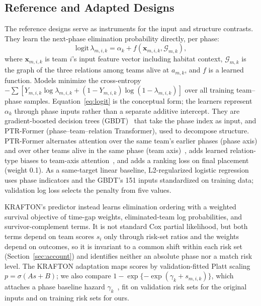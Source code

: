 \documentclass[sigconf,anonymous,nonacm]{acmart}
\begin{document}
\subsection{Reference and Adapted Designs}
\label{sec:method:rq2}
The reference designs serve as instruments for the input and structure contrasts. They learn the next-phase elimination probability directly, per phase:
\begin{equation}
\mathrm{logit}\,\lambda_{m,i,k}=\alpha_k+f(\mathbf{x}_{m,i,k},\mathcal{G}_{m,k}),
\label{eq:logit}
\end{equation}
where $\mathbf{x}_{m,i,k}$ is team $i$'s input feature vector including habitat context, $\mathcal{G}_{m,k}$ is the graph of the three relations among teams alive at $a_{m,k}$, and $f$ is a learned function.
Models minimize the cross-entropy $-\sum[Y_{m,i,k}\log\lambda_{m,i,k}+(1-Y_{m,i,k})\log(1-\lambda_{m,i,k})]$ over all training team--phase samples.
Equation~\eqref{eq:logit} is the conceptual form; the learners represent $\alpha_k$ through phase inputs rather than a separate additive intercept. They are gradient-boosted decision trees (GBDT)~\cite{Friedman01} that take the phase index as input, and PTR-Former (phase--team--relation Transformer), used to decompose structure.
PTR-Former alternates attention over the same team's earlier phases (phase axis) and over other teams alive in the same phase (team axis)~\cite{Vaswani17,Ngiam22}, adds learned relation-type biases to team-axis attention~\cite{Ying21,Xenopoulos21}, and adds a ranking loss on final placement (weight 0.1). As a same-target linear baseline, L2-regularized logistic regression uses phase indicators and the GBDT's 151 inputs standardized on training data; validation log loss selects the penalty from five values.

KRAFTON's predictor instead learns elimination ordering with a weighted survival objective of time-gap weights, eliminated-team log probabilities, and survivor-complement terms. It is not standard Cox partial likelihood, but both terms depend on team scores $s_i$ only through risk-set ratios and the weights depend on outcomes, so it is invariant to a common shift within each risk set (Section~\ref{sec:account}) and identifies neither an absolute phase nor a match risk level. The KRAFTON adaptation maps scores by validation-fitted Platt scaling $p=\sigma(A s+B)$; we also compare $1-\exp\{-\exp(\gamma_k+s_{m,i,k})\}$, which attaches a phase baseline hazard $\gamma_k$~\cite{PrenticeGloeckler78}, fit on validation risk sets for the original inputs and on training risk sets for ours.
\end{document}
